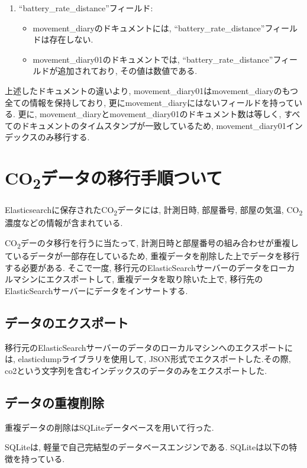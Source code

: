\begin{enumerate}
  \item ``battery\_rate\_distance''フィールド:
        \begin{itemize}
          \item movement\_diaryのドキュメントには, ``battery\_rate\_distance''フィールドは存在しない.
          \item movement\_diary01のドキュメントでは, ``battery\_rate\_distance''フィールドが追加されており, その値は数値である.
        \end{itemize}
\end{enumerate}

上述したドキュメントの違いより, movement\_diary01はmovement\_diaryのもつ全ての情報を保持しており, 更にmovement\_diaryにはないフィールドを持っている. 更に, movement\_diaryとmovement\_diary01のドキュメント数は等しく, すべてのドキュメントのタイムスタンプが一致しているため, movement\_diary01インデックスのみ移行する.

\section{CO\textsubscript{2}データの移行手順ついて}
Elasticsearchに保存されたCO\textsubscript{2}データには, 計測日時, 部屋番号, 部屋の気温, CO\textsubscript{2}濃度などの情報が含まれている.

CO\textsubscript{2}デーのタ移行を行うに当たって, 計測日時と部屋番号の組み合わせが重複しているデータが一部存在しているため, 重複データを削除した上でデータを移行する必要がある. そこで一度, 移行元のElasticSearchサーバーのデータをローカルマシンにエクスポートして, 重複データを取り除いた上で, 移行先のElasticSearchサーバーにデータをインサートする.

\subsection{データのエクスポート}
移行元のElasticSearchサーバーのデータのローカルマシンへのエクスポートには, elasticdumpライブラリを使用して, JSON形式でエクスポートした.その際, co2という文字列を含むインデックスのデータのみをエクスポートした.

\subsection{データの重複削除}
重複データの削除はSQLiteデータベースを用いて行った.

SQLiteは, 軽量で自己完結型のデータベースエンジンである. SQLiteは以下の特徴を持っている.

